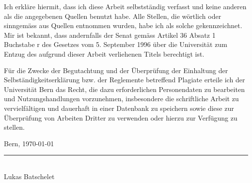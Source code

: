 \documentclass{template}
\begin{document}
Ich erkläre hiermit, dass ich diese Arbeit selbstständig verfasst und keine anderen als die angegebenen Quellen benutzt habe. Alle Stellen, die wörtlich oder sinngemäss aus Quellen entnommen wurden, habe ich als solche gekennzeichnet. Mir ist bekannt, dass andernfalls der Senat gemäss Artikel 36 Absatz 1 Buchstabe r des Gesetzes vom 5. September 1996 über die Universität zum Entzug des aufgrund dieser Arbeit verliehenen Titels berechtigt ist.

Für die Zwecke der Begutachtung und der Überprüfung der Einhaltung der Selbständigkeitserklärung bzw. der Reglemente betreffend Plagiate erteile ich der Universität Bern das Recht, die dazu erforderlichen Personendaten zu bearbeiten und Nutzungshandlungen vorzunehmen, insbesondere die schriftliche Arbeit zu vervielfältigen und dauerhaft in einer Datenbank zu speichern sowie diese zur Überprüfung von Arbeiten Dritter zu verwenden oder hierzu zur Verfügung zu stellen.

\vspace{8cm}

\noindent Bern, \today

\vspace{2cm}

\noindent\rule{6cm}{0.4pt} \\
\noindent Lukas Batschelet




\clearpage
{}
   
   
\end{document}
